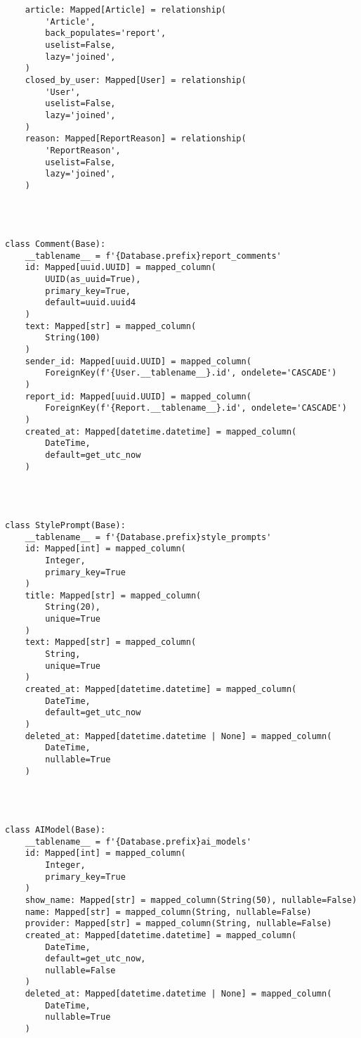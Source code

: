 \begin{lstlisting}
    article: Mapped[Article] = relationship(
        'Article',
        back_populates='report',
        uselist=False,
        lazy='joined',
    )
    closed_by_user: Mapped[User] = relationship(
        'User',
        uselist=False,
        lazy='joined',
    )
    reason: Mapped[ReportReason] = relationship(
        'ReportReason',
        uselist=False,
        lazy='joined',
    )




class Comment(Base):
    __tablename__ = f'{Database.prefix}report_comments'
    id: Mapped[uuid.UUID] = mapped_column(
        UUID(as_uuid=True),
        primary_key=True,
        default=uuid.uuid4
    )
    text: Mapped[str] = mapped_column(
        String(100)
    )
    sender_id: Mapped[uuid.UUID] = mapped_column(
        ForeignKey(f'{User.__tablename__}.id', ondelete='CASCADE')
    )
    report_id: Mapped[uuid.UUID] = mapped_column(
        ForeignKey(f'{Report.__tablename__}.id', ondelete='CASCADE')
    )
    created_at: Mapped[datetime.datetime] = mapped_column(
        DateTime,
        default=get_utc_now
    )




class StylePrompt(Base):
    __tablename__ = f'{Database.prefix}style_prompts'
    id: Mapped[int] = mapped_column(
        Integer,
        primary_key=True
    )
    title: Mapped[str] = mapped_column(
        String(20),
        unique=True
    )
    text: Mapped[str] = mapped_column(
        String,
        unique=True
    )
    created_at: Mapped[datetime.datetime] = mapped_column(
        DateTime,
        default=get_utc_now
    )
    deleted_at: Mapped[datetime.datetime | None] = mapped_column(
        DateTime,
        nullable=True
    )




class AIModel(Base):
    __tablename__ = f'{Database.prefix}ai_models'
    id: Mapped[int] = mapped_column(
        Integer,
        primary_key=True
    )
    show_name: Mapped[str] = mapped_column(String(50), nullable=False)
    name: Mapped[str] = mapped_column(String, nullable=False)
    provider: Mapped[str] = mapped_column(String, nullable=False)
    created_at: Mapped[datetime.datetime] = mapped_column(
        DateTime,
        default=get_utc_now,
        nullable=False
    )
    deleted_at: Mapped[datetime.datetime | None] = mapped_column(
        DateTime,
        nullable=True
    )





\end{lstlisting}
